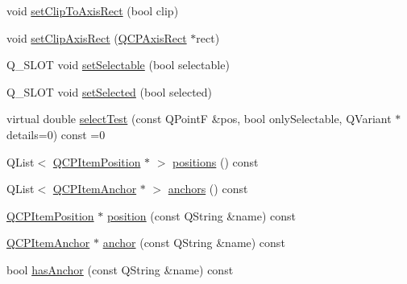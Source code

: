 \begin{DoxyCompactItemize}
\item 
void \hyperlink{classQCPAbstractItem_a39e05b9d4176b9accafc746d16ca6a06}{set\+Clip\+To\+Axis\+Rect} (bool clip)
\item 
void \hyperlink{classQCPAbstractItem_a7dc75fcbcd10206fe0b75d757ea7a347}{set\+Clip\+Axis\+Rect} (\hyperlink{classQCPAxisRect}{Q\+C\+P\+Axis\+Rect} $\ast$rect)
\item 
Q\+\_\+\+S\+L\+O\+T void \hyperlink{classQCPAbstractItem_a8a8e32a55bc478b849756a78c2d87fd2}{set\+Selectable} (bool selectable)
\item 
Q\+\_\+\+S\+L\+O\+T void \hyperlink{classQCPAbstractItem_a203de94ad586cc44d16c9565f49d3378}{set\+Selected} (bool selected)
\item 
virtual double \hyperlink{classQCPAbstractItem_a96d522d10ffc0413b9a366c6f7f0476b}{select\+Test} (const Q\+Point\+F \&pos, bool only\+Selectable, Q\+Variant $\ast$details=0) const =0
\item 
Q\+List$<$ \hyperlink{classQCPItemPosition}{Q\+C\+P\+Item\+Position} $\ast$ $>$ \hyperlink{classQCPAbstractItem_adf6a680cc29a6bce8345c3b6af3a91a1}{positions} () const 
\item 
Q\+List$<$ \hyperlink{classQCPItemAnchor}{Q\+C\+P\+Item\+Anchor} $\ast$ $>$ \hyperlink{classQCPAbstractItem_a8454b9941960b840608a5a1e00b1977d}{anchors} () const 
\item 
\hyperlink{classQCPItemPosition}{Q\+C\+P\+Item\+Position} $\ast$ \hyperlink{classQCPAbstractItem_af71345bd150f87fa1d2442837b87bb59}{position} (const Q\+String \&name) const 
\item 
\hyperlink{classQCPItemAnchor}{Q\+C\+P\+Item\+Anchor} $\ast$ \hyperlink{classQCPAbstractItem_abed974cba7cc02608c71dad4638e008d}{anchor} (const Q\+String \&name) const 
\item 
bool \hyperlink{classQCPAbstractItem_acbce9e5ba5252541d19db0c40303357a}{has\+Anchor} (const Q\+String \&name) const 
\end{DoxyCompactItemize}
